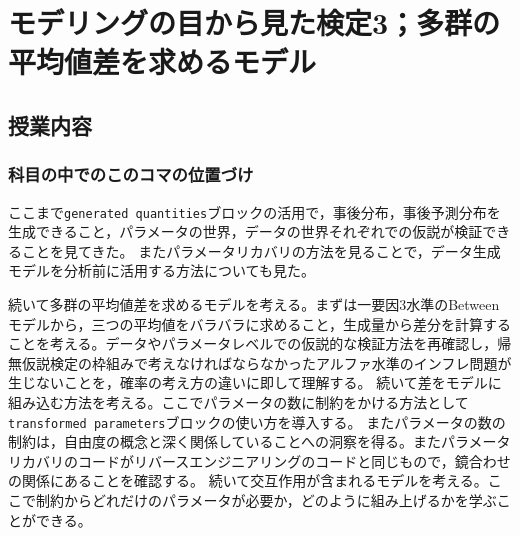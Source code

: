 \section{モデリングの目から見た検定3；多群の平均値差を求めるモデル}
\subsection{授業内容}
\subsubsection{科目の中でのこのコマの位置づけ}
ここまで\verb|generated quantities|ブロックの活用で，事後分布，事後予測分布を生成できること，パラメータの世界，データの世界それぞれでの仮説が検証できることを見てきた。
またパラメータリカバリの方法を見ることで，データ生成モデルを分析前に活用する方法についても見た。

続いて多群の平均値差を求めるモデルを考える。まずは一要因3水準のBetweenモデルから，三つの平均値をバラバラに求めること，生成量から差分を計算することを考える。データやパラメータレベルでの仮説的な検証方法を再確認し，帰無仮説検定の枠組みで考えなければならなかったアルファ水準のインフレ問題が生じないことを，確率の考え方の違いに即して理解する。
続いて差をモデルに組み込む方法を考える。ここでパラメータの数に制約をかける方法として\verb|transformed parameters|ブロックの使い方を導入する。
またパラメータの数の制約は，自由度の概念と深く関係していることへの洞察を得る。またパラメータリカバリのコードがリバースエンジニアリングのコードと同じもので，鏡合わせの関係にあることを確認する。
続いて交互作用が含まれるモデルを考える。ここで制約からどれだけのパラメータが必要か，どのように組み上げるかを学ぶことができる。


